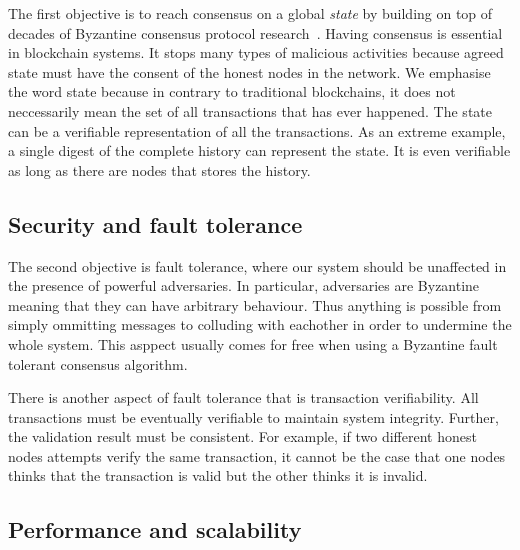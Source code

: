 The first objective is to reach consensus on a global \emph{state} by building on top of decades of Byzantine consensus protocol research~\cite{pease1980reaching, lamport1982byzantine, castro1999practical, miller2016honey}.
Having consensus is essential in blockchain systems.
It stops many types of malicious activities because agreed state must have the consent of the honest nodes in the network.
We emphasise the word state because in contrary to traditional blockchains,
it does not neccessarily mean the set of all transactions that has ever happened.
The state can be a verifiable representation of all the transactions.
As an extreme example, a single digest of the complete history can represent the state.
It is even verifiable as long as there are nodes that stores the history.


\subsection{Security and fault tolerance}

The second objective is fault tolerance,
where our system should be unaffected in the presence of powerful adversaries.
In particular, adversaries are Byzantine meaning that they can have arbitrary behaviour.
Thus anything is possible from simply ommitting messages to colluding with eachother in order to undermine the whole system.
This asppect usually comes for free when using a Byzantine fault tolerant consensus algorithm.

There is another aspect of fault tolerance that is transaction verifiability.
All transactions must be eventually verifiable to maintain system integrity.
Further, the validation result must be consistent.
For example, if two different honest nodes attempts verify the same transaction,
it cannot be the case that one nodes thinks that the transaction is valid but the other thinks it is invalid.


\subsection{Performance and scalability}

